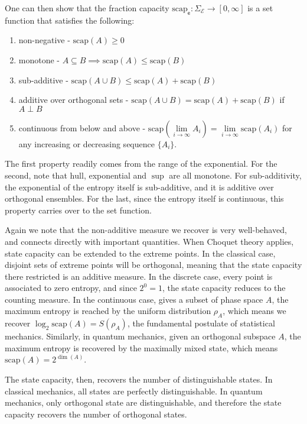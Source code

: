 \documentclass[10pt,twocolumn, nofootinbib]{revtex4-2}
\newcommand\hull{\mathrm{hull}}
\newcommand\capacity{\mathrm{scap}}
\newcommand{\ens}[1][e] {\mathsf{#1}} %
\newcommand{\Ens}[1][E] {\mathcal{#1}} %
\def\ortho{\perp}
\begin{document}
One can then show that the fraction capacity $\capacity_{\ens} : \Sigma_{\Ens} \to [0,\infty]$ is a set function that satisfies the following:
\begin{enumerate}
	\item non-negative - $\capacity(A)\geq 0$
	\item monotone - $A \subseteq B \implies \capacity(A) \leq \capacity(B)$
	\item sub-additive - $\capacity(A \cup B) \leq \capacity(A) + \capacity(B)$
	\item additive over orthogonal sets - $\capacity(A \cup B) = \capacity(A) + \capacity(B)$ if $A \ortho B$
	\item continuous from below and above - $\capacity(\lim\limits_{i \to \infty} A_i) = \lim\limits_{i \to \infty} \capacity(A_i)$ for any increasing or decreasing sequence $\{A_i\}$.
\end{enumerate}

The first property readily comes from the range of the exponential. For the second, note that $\hull$, exponential and $\sup$ are all monotone. For sub-additivity, the exponential of the entropy itself is sub-additive, and it is additive over orthogonal ensembles. For the last, since the entropy itself  is continuous, this property carries over to the set function.

Again we note that the non-additive measure we recover is very well-behaved, and connects directly with important quantities. When Choquet theory applies, state capacity can be extended to the extreme points. In the classical case, disjoint sets of extreme points will be orthogonal, meaning that the state capacity there restricted is an additive measure. In the discrete case, every point is associated to zero entropy, and since $2^0=1$, the state capacity reduces to the counting measure. In the continuous case, gives a subset of phase space $A$, the maximum entropy is reached by the uniform distribution $\rho_A$, which means we recover $\log_2 \capacity(A) = S(\rho_A)$, the fundamental postulate of statistical mechanics. Similarly, in quantum mechanics, given an orthogonal subspace $A$, the maximum entropy is recovered by the maximally mixed state, which means $\capacity(A) = 2^{\dim(A)}$.

The state capacity, then, recovers the number of distinguishable states. In classical mechanics, all states are perfectly distinguishable. In quantum mechanics, only orthogonal state are distinguishable, and therefore the state capacity recovers the number of orthogonal states.
\end{document}
